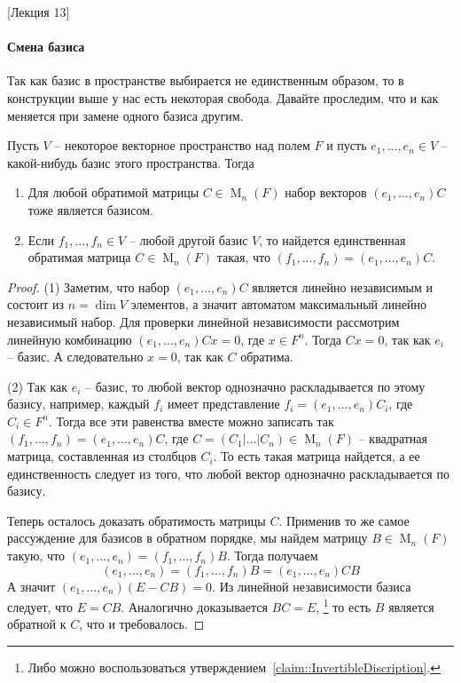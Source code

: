 [Лекция 13]


\paragraph{Смена базиса}

Так как базис в пространстве выбирается не единственным образом, то в конструкции выше у нас есть некоторая свобода.
Давайте проследим, что и как меняется при замене одного базиса другим.

\begin{claim}
\label{claim::BasisClassification}
Пусть $V$ -- некоторое векторное пространство над полем $F$ и пусть $e_1,\ldots, e_n\in V$ -- какой-нибудь базис этого пространства.
Тогда
\begin{enumerate}
\item Для любой обратимой матрицы $C\in \operatorname{M}_{n}(F)$ набор векторов $(e_1,\ldots,e_n)C$ тоже является базисом.

\item Если $f_1,\ldots,f_n\in V$ -- любой другой базис $V$, то найдется единственная обратимая матрица $C\in\operatorname{M}_n(F)$ такая, что $(f_1,\ldots,f_n) = (e_1,\ldots,e_n)C$.
\end{enumerate}
\end{claim}
\begin{proof}
(1) Заметим, что набор $(e_1,\ldots,e_n)C$ является линейно независимым и состоит из $n = \dim V$ элементов, а значит автоматом максимальный линейно независимый набор.
Для проверки линейной независимости рассмотрим линейную комбинацию $(e_1,\ldots,e_n)Cx = 0$, где $x\in F^n$.
Тогда $Cx = 0$, так как $e_i$ -- базис.
А следовательно $x = 0$, так как $C$ обратима.

(2) Так как $e_i$ -- базис, то любой вектор однозначно раскладывается по этому базису, например, каждый $f_i$ имеет представление $f_i = (e_1,\ldots, e_n) C_i$, где $C_i\in F^n$.
Тогда все эти равенства вместе можно записать так $(f_1,\ldots,f_n) = (e_1,\ldots,e_n) C$, где $C = (C_1|\ldots|C_n)\in \operatorname{M}_n (F)$ -- квадратная матрица, составленная из столбцов $C_i$.
То есть такая матрица найдется, а ее единственность следует из того, что любой вектор однозначно раскладывается по базису.

Теперь осталось доказать обратимость матрицы $C$.
Применив то же самое рассуждение для базисов в обратном порядке, мы найдем матрицу $B\in \operatorname{M}_n(F)$ такую, что $(e_1,\ldots,e_n) = (f_1,\ldots,f_n) B$.
Тогда получаем 
\[
(e_1,\ldots,e_n) = (f_1,\ldots,f_n)B = (e_1,\ldots,e_n)CB
\]
А значит $(e_1,\ldots, e_n)(E - CB) = 0$.
Из линейной независимости базиса следует, что $E = CB$.
Аналогично доказывается $BC = E$,%
\footnote{Либо можно воспользоваться утверждением~\ref{claim::InvertibleDiscription}.}
то есть $B$ является обратной к $C$, что и требовалось.
\end{proof}

